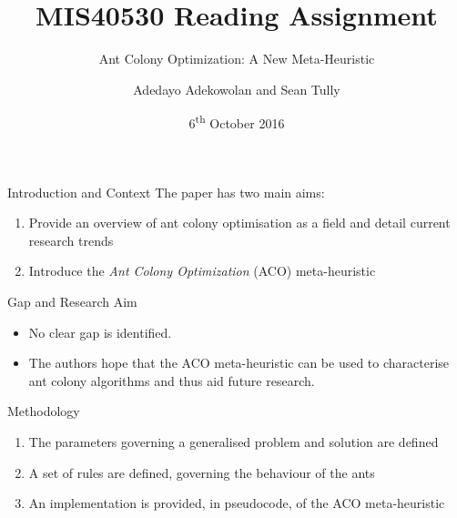 \documentclass[aspectratio=169]{beamer}
\title{MIS40530 Reading Assignment}
\subtitle{Ant Colony Optimization: A New Meta-Heuristic}
\author{Adedayo Adekowolan and Sean Tully}
\institute{UCD}
\date{6\textsuperscript{th} October 2016}
\begin{document}
    \begin{frame}
        \titlepage
    \end{frame}

    \begin{frame}{Introduction and Context}
        The paper has two main aims:
        \begin{enumerate}
            \item Provide an overview of ant colony optimisation as a field and detail current research trends
            \item Introduce the \emph{Ant Colony Optimization} (ACO) meta-heuristic
        \end{enumerate}
    \end{frame}

    \begin{frame}{Gap and Research Aim}
        \begin{itemize}
            \item No clear gap is identified.
            \item The authors hope that the ACO meta-heuristic can be used to characterise ant colony algorithms and thus aid future research.
        \end{itemize}
    \end{frame}

    \begin{frame}{Methodology}
        \begin{enumerate}
            \item The parameters governing a generalised problem and solution are defined
            \item A set of rules are defined, governing the behaviour of the ants
            \item An implementation is provided, in pseudocode, of the ACO meta-heuristic
        \end{enumerate}
    \end{frame}
\end{document}
